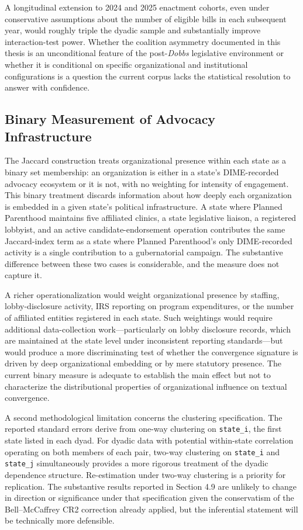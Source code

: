 A longitudinal extension to 2024 and 2025 enactment cohorts, even under conservative assumptions about the number of eligible bills in each subsequent year, would roughly triple the dyadic sample and substantially improve interaction-test power. Whether the coalition asymmetry documented in  this thesis is an unconditional feature of the post-\emph{Dobbs} legislative environment or whether it is conditional on specific organizational and institutional configurations is a question the current corpus lacks the statistical resolution to answer with confidence.

\subsection{Binary Measurement of Advocacy Infrastructure}
\label{subsec:binary-measurement}
The Jaccard construction treats organizational presence within each state as a binary set membership: an organization is either in a state's DIME-recorded advocacy ecosystem or it is not, with no weighting for intensity of engagement. This binary treatment discards information about how deeply each organization is embedded in a given state's political infrastructure. A state where Planned Parenthood maintains five affiliated clinics, a state legislative liaison, a registered lobbyist, and an active candidate-endorsement operation contributes the same Jaccard-index term as a state where Planned Parenthood's only DIME-recorded activity is a single contribution to a gubernatorial campaign. The substantive difference between these two cases is considerable, and the measure does not capture it.

A richer operationalization would weight organizational presence by staffing, lobby-disclosure activity, IRS reporting on program expenditures, or the number of affiliated entities registered in each state. Such weightings would require additional data-collection work---particularly on lobby disclosure records, which are maintained at the state level under inconsistent reporting standards---but would produce a more discriminating test of whether the convergence signature is driven by deep organizational embedding or by mere statutory presence. The current binary measure is adequate to establish the main effect but not to characterize the distributional properties of organizational influence on textual convergence.

A second methodological limitation concerns the clustering specification. The reported standard errors derive from one-way clustering on \texttt{state\_i},
the first state listed in each dyad. For dyadic data with potential within-state correlation operating on both members of each pair, two-way clustering on \texttt{state\_i} and \texttt{state\_j} simultaneously
\parencite{robustinference,aronow2015clusterrobustvarianceestimationdyadic} provides a more rigorous treatment of the dyadic dependence structure. Re-estimation under two-way clustering is a priority for replication. The substantive
results reported in Section 4.9 are unlikely to change in direction or significance under that specification given the conservatism of the Bell--McCaffrey CR2 correction already applied, but the inferential statement will be technically more defensible. 


